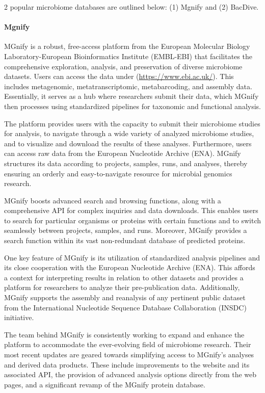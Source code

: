                 2 popular microbiome databases are outlined below: (1) Mgnify\cite{richardson2023mgnify} and (2) BacDive\cite{reimer2022bac}.
                
        \paragraph*{Mgnify}
            MGnify is a robust, free-access platform from the European Molecular Biology Laboratory-European Bioinformatics Institute (EMBL-EBI) that facilitates the comprehensive exploration, analysis, and preservation of diverse microbiome datasets. Users can access the data under (\url{https://www.ebi.ac.uk/}). This includes metagenomic, metatranscriptomic, metabarcoding, and assembly data. Essentially, it serves as a hub where researchers submit their data, which MGnify then processes using standardized pipelines for taxonomic and functional analysis\cite{richardson2023mgnify}.

            The platform provides users with the capacity to submit their microbiome studies for analysis, to navigate through a wide variety of analyzed microbiome studies, and to visualize and download the results of these analyses. Furthermore, users can access raw data from the European Nucleotide Archive (ENA). MGnify structures its data according to projects, samples, runs, and analyses, thereby ensuring an orderly and easy-to-navigate resource for microbial genomics research.

            MGnify boosts advanced search and browsing functions, along with a comprehensive API for complex inquiries and data downloads. This enables users to search for particular organisms or proteins with certain functions and to switch seamlessly between projects, samples, and runs. Moreover, MGnify provides a search function within its vast non-redundant database of predicted proteins.

            One key feature of MGnify is its utilization of standardized analysis pipelines and its close cooperation with the European Nucleotide Archive (ENA). This affords a context for interpreting results in relation to other datasets and provides a platform for researchers to analyze their pre-publication data. Additionally, MGnify supports the assembly and reanalysis of any pertinent public dataset from the International Nucleotide Sequence Database Collaboration (INSDC) initiative.

            The team behind MGnify is consistently working to expand and enhance the platform to accommodate the ever-evolving field of microbiome research. Their most recent updates are geared towards simplifying access to MGnify's analyses and derived data products. These include improvements to the website and its associated API, the provision of advanced analysis options directly from the web pages, and a significant revamp of the MGnify protein database.
            
